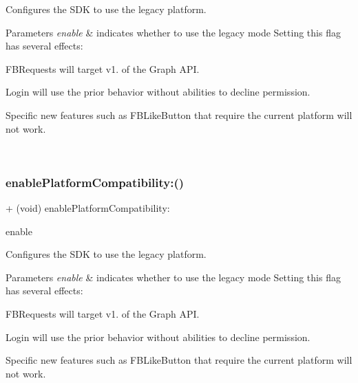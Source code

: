 Configures the S\+DK to use the legacy platform. 
\begin{DoxyParams}{Parameters}
{\em enable} & indicates whether to use the legacy mode  Setting this flag has several effects\+:
\begin{DoxyItemize}
\item F\+B\+Requests will target v1. of the Graph A\+PI.
\item Login will use the prior behavior without abilities to decline permission.
\item Specific new features such as {\ttfamily F\+B\+Like\+Button} that require the current platform will not work. 
\end{DoxyItemize}\\
\hline
\end{DoxyParams}
\mbox{\label{interfaceFBSettings_a896c1bdd4227035fba49c90d06c101a2}} 
\subsubsection{\texorpdfstring{enable\+Platform\+Compatibility\+:()}{enablePlatformCompatibility:()}\hspace{0.1cm}{\footnotesize\ttfamily [2/5]}}
{\footnotesize\ttfamily + (void) enable\+Platform\+Compatibility\+: \begin{DoxyParamCaption}\item[{(B\+O\+OL)}]{enable }\end{DoxyParamCaption}}

Configures the S\+DK to use the legacy platform. 
\begin{DoxyParams}{Parameters}
{\em enable} & indicates whether to use the legacy mode  Setting this flag has several effects\+:
\begin{DoxyItemize}
\item F\+B\+Requests will target v1. of the Graph A\+PI.
\item Login will use the prior behavior without abilities to decline permission.
\item Specific new features such as {\ttfamily F\+B\+Like\+Button} that require the current platform will not work. 
\end{DoxyItemize}\\
\hline
\end{DoxyParams}
\mbox{\label{interfaceFBSettings_a896c1bdd4227035fba49c90d06c101a2}} 
